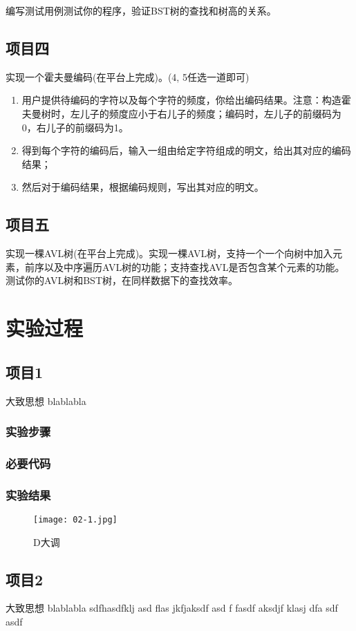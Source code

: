 编写测试用例测试你的程序，验证BST树的查找和树高的关系。

\subsection{项目四}
实现一个霍夫曼编码(在平台上完成)。(4, 5任选一道即可)
\begin{enumerate}
\item 用户提供待编码的字符以及每个字符的频度，你给出编码结果。注意：构造霍夫曼树时，左儿子的频度应小于右儿子的频度；编码时，左儿子的前缀码为0，右儿子的前缀码为1。
\item 得到每个字符的编码后，输入一组由给定字符组成的明文，给出其对应的编码结果；
\item  然后对于编码结果，根据编码规则，写出其对应的明文。
\end{enumerate}

\subsection{项目五}
实现一棵AVL树(在平台上完成)。实现一棵AVL树，支持一个一个向树中加入元素，前序以及中序遍历AVL树的功能；支持查找AVL是否包含某个元素的功能。测试你的AVL树和BST树，在同样数据下的查找效率。


\section{实验过程}
\subsection{项目1}
大致思想 blablabla
\subsubsection{实验步骤}
\subsubsection{必要代码}

\subsubsection{实验结果}
	\begin{figure}[!bthp]
	\centering
        \texttt{[image: 02-1.jpg]}
        \caption{D大调}
      \end{figure}

\subsection{项目2}
大致思想 blablabla sdfhasdfklj asd flas jkfjaksdf asd f
fasdf aksdjf klasj dfa
sdf
asdf


